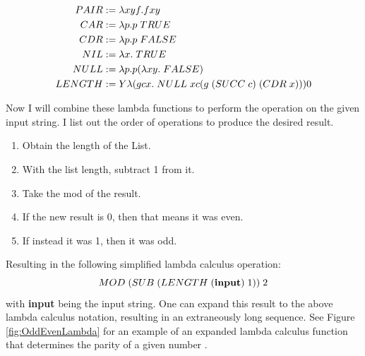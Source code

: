 \[\begin{aligned}
        PAIR &:= \lambda xyf. f x y\\
        CAR &:= \lambda p. p \hspace{0.1cm} TRUE\\
        CDR &:= \lambda p. p \hspace{0.1cm} FALSE\\
        NIL &:= \lambda x. \hspace{0.1cm} TRUE\\
        NULL &:= \lambda p. p (\lambda xy. \hspace{0.1cm} FALSE)\\
        LENGTH &:= Y \lambda (gcx. \hspace{0.1cm} NULL \hspace{0.1cm} x c (g \hspace{0.1cm} (SUCC \hspace{0.1cm} c) \hspace{0.1cm} (CDR \hspace{0.1cm} x))) 0\\
    \end{aligned}
\]

Now I will combine these lambda functions to perform the operation on the given input string.
I list out the order of operations to produce the desired result.

\begin{enumerate}
    \item Obtain the length of the List.
    \item With the list length, subtract 1 from it.
    \item Take the mod of the result.
    \item If the new result is 0, then that means it was even.
    \item If instead it was 1, then it was odd.
\end{enumerate}

Resulting in the following simplified lambda calculus operation:\[MOD \hspace{0.1cm} (SUB \hspace{0.1cm} (LENGTH \hspace{0.1cm} (\textbf{input}) \hspace{0.1cm} 1)) \hspace{0.1cm} 2\]
with \textbf{input} being the input string.
One can expand this result to the above lambda calculus notation, resulting in an extraneously long sequence.
See Figure \ref{fig:OddEvenLambda} for an example of an expanded lambda calculus function that determines the parity of a given number \cite{RedditLambdaCalcPost,RedditLambdaCalcComment}.

